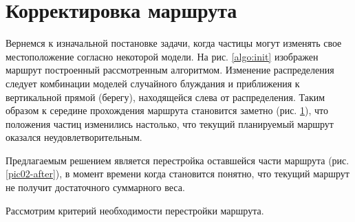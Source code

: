 \section{Корректировка маршрута}
\begin{figure}[ht]
  \centering
\begin{minipage}[t]{.4\textwidth}
  \centering
  \label{algo:init}
\end{minipage}
\begin{minipage}[t]{.4\textwidth}
  \centering
  \label{algo:before}
\end{minipage}
\end{figure}

Вернемся к изначальной постановке задачи, когда частицы могут изменять свое местоположение
согласно некоторой модели. На рис. \ref{algo:init} изображен маршрут построенный
рассмотренным алгоритмом. Изменение распределения следует комбинации моделей случайного
блуждания и приближения к вертикальной прямой (берегу), находящейся слева от распределения.
Таким образом к середине прохождения маршрута становится заметно (рис. \ref{algo:before}), что
положения частиц изменились настолько, что текущий планируемый маршрут оказался неудовлетворительным.


Предлагаемым решением является перестройка оставшейся части маршрута (рис. \ref{pic02-after}),
в момент времени когда становится понятно, что текущий маршрут не получит достаточного
суммарного веса.

Рассмотрим критерий необходимости перестройки маршрута.


\FloatBarrier

